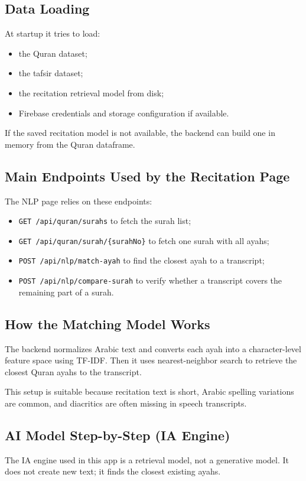 \documentclass[11pt,a4paper]{article}
\begin{document}
\subsection{Data Loading}
At startup it tries to load:
\begin{itemize}
  \item the Quran dataset;
  \item the tafsir dataset;
  \item the recitation retrieval model from disk;
  \item Firebase credentials and storage configuration if available.
\end{itemize}

If the saved recitation model is not available, the backend can build one in memory from the Quran dataframe.

\subsection{Main Endpoints Used by the Recitation Page}
The NLP page relies on these endpoints:
\begin{itemize}
  \item \texttt{GET /api/quran/surahs} to fetch the surah list;
  \item \texttt{GET /api/quran/surah/\{surahNo\}} to fetch one surah with all ayahs;
  \item \texttt{POST /api/nlp/match-ayah} to find the closest ayah to a transcript;
  \item \texttt{POST /api/nlp/compare-surah} to verify whether a transcript covers the remaining part of a surah.
\end{itemize}

\subsection{How the Matching Model Works}
The backend normalizes Arabic text and converts each ayah into a character-level feature space using TF-IDF. Then it uses nearest-neighbor search to retrieve the closest Quran ayahs to the transcript.

This setup is suitable because recitation text is short, Arabic spelling variations are common, and diacritics are often missing in speech transcripts.

\subsection{AI Model Step-by-Step (IA Engine)}
The IA engine used in this app is a retrieval model, not a generative model. It does not create new text; it finds the closest existing ayahs.
\end{document}
